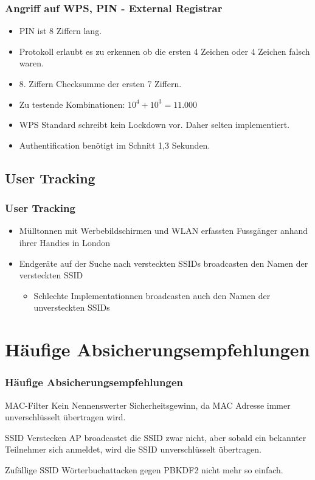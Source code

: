 \documentclass{beamer}
\begin{document}
\begin{frame}
\frametitle{Angriff auf WPS, PIN - External Registrar \cite{wps_attack}}
\begin{itemize}
	\item PIN ist 8 Ziffern lang.
	\item Protokoll erlaubt es zu erkennen ob die ersten 4 Zeichen oder 4 Zeichen falsch waren.
	\item 8. Ziffern Checksumme der ersten 7 Ziffern.
	\item Zu testende Kombinationen: $10^4+10^3 = 11.000$
	\item WPS Standard schreibt kein Lockdown vor. Daher selten implementiert.
	\item Authentification benötigt im Schnitt 1,3 Sekunden.
\end{itemize}
\end{frame}

\subsection{User Tracking}
\begin{frame}
\frametitle{User Tracking}
\begin{itemize}
	\item Mülltonnen mit Werbebildschirmen und WLAN erfassten Fussgänger anhand ihrer Handies in London \cite{mulltonnen}
	\item Endgeräte auf der Suche nach versteckten SSIDs broadcasten den Namen der versteckten SSID
	\begin{itemize}
		\item Schlechte Implementationnen broadcasten auch den Namen der unversteckten SSIDs
	\end{itemize}
\end{itemize}
\end{frame}

\section{Häufige Absicherungsempfehlungen}
\begin{frame}
\frametitle{Häufige Absicherungsempfehlungen}
\begin{block}{MAC-Filter}
Kein Nennenswerter Sicherheitsgewinn, da MAC Adresse immer unverschlüsselt übertragen wird.
\end{block}
\begin{block}{SSID Verstecken}
AP broadcastet die SSID zwar nicht, aber sobald ein bekannter Teilnehmer sich anmeldet, wird die SSID unverschlüsselt übertragen.
\end{block} 
\begin{block}{Zufällige SSID}
Wörterbuchattacken gegen PBKDF2 nicht mehr so einfach.
\end{block}
\end{frame}
\end{document}
